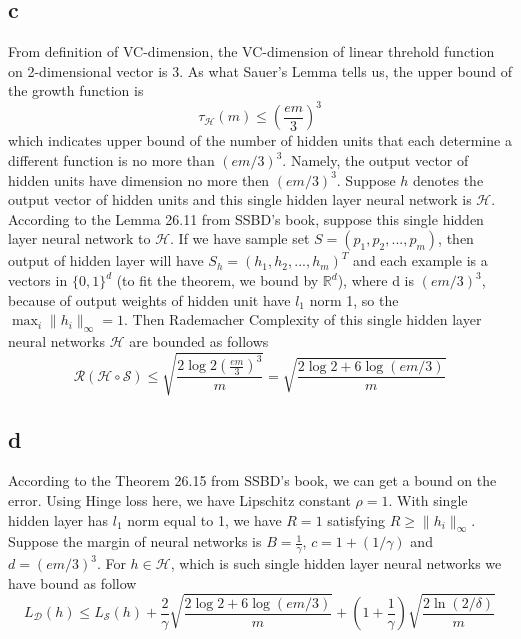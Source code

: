 \documentclass{article}
\begin{document}
	\subsection{c}
	From definition of VC-dimension, the VC-dimension of linear threhold function on 2-dimensional vector is 3.
	As what Sauer's Lemma tells us, the upper bound of the growth function is
	$$
	\tau_{\mathcal{H}}(m) \leq (\frac{em}{3})^3
	$$
	which indicates upper bound of the number of hidden units that each determine a different function is no more than $(em/3)^3$. Namely, the output vector of hidden units have dimension no more then $(em/3)^3$. Suppose $h$ denotes the output vector of hidden units and this single hidden layer neural network is $\mathcal{H}$.
	According to the Lemma 26.11 from SSBD's book, suppose this single hidden layer neural network to $\mathcal{H}$. If we have sample set $S=(p_1, p_2,...,p_m)$, then output of hidden layer will have $S_h=(h_1, h_2,...,h_m)^T$ and each example is a vectors in $\{0,1\}^d$ (to fit the theorem, we bound by $\mathbb{R}^d$), where d is $(em/3)^3$, because of output weights of hidden unit have $l_1$ norm 1, so the $\max_{i}\|h_i\|_{\infty} = 1$. Then Rademacher Complexity of this single hidden layer neural networks $\mathcal{H}$ are bounded as follows
	$$
	\mathcal{R}(\mathcal{H}\circ\mathcal{S}) \leq \sqrt{\frac{2\log{2(\frac{em}{3})^3}}{m}}=\sqrt{\frac{2\log{2}+6\log({em/3})}{m}}
	$$

	\subsection{d}
	According to the Theorem 26.15 from SSBD's book, we can get a bound on the error. Using Hinge loss here, we have Lipschitz constant $\rho=1$. With single hidden layer has $l_1$ norm equal to 1, we have $R=1$ satisfying $R \geq \|h_i\|_{\infty}$. Suppose the margin of neural networks is $B=\frac{1}{\gamma}$, $c=1+(1/\gamma)$ and $d=(em/3)^3$. For $h \in \mathcal{H}$, which is such single hidden layer neural networks we have bound as follow
	$$
	L_{\mathcal{D}}(h) \leq L_{\mathcal{S}}(h)+\frac{2}{\gamma}\sqrt{\frac{2\log2+6\log({em/3})}{m}}+(1+\frac{1}{\gamma})\sqrt{\frac{2\ln({2/\delta})}{m}}
	$$
	
\end{document}
